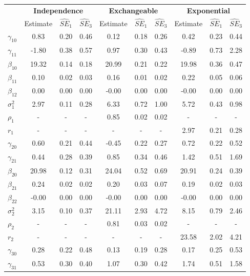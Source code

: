 \begin{table}[ht]
\begin{center}
\begin{tabular}{lccccccccc}
  \thickhline&\multicolumn{3}{c}{\textbf{Independence}}&\multicolumn{3}{c}{\textbf{Exchangeable}}&\multicolumn{3}{c}{\textbf{Exponential}}\\&Estimate&$\widehat{SE}_1$&$\widehat{SE}_3$&Estimate&$\widehat{SE}_1$&$\widehat{SE}_3$&Estimate&$\widehat{SE}_1$&$\widehat{SE}_3$\\\hline $\gamma_{10}$ & 0.83 & 0.20 & 0.46 & 0.12 & 0.18 & 0.26 & 0.42 & 0.23 & 0.44 \\ 
  $\gamma_{11}$ & -1.80 & 0.38 & 0.57 & 0.97 & 0.30 & 0.43 & -0.89 & 0.73 & 2.28 \\ 
  $\beta_{10}$ & 19.32 & 0.14 & 0.18 & 20.99 & 0.21 & 0.22 & 19.98 & 0.36 & 0.47 \\ 
  $\beta_{11}$ & 0.10 & 0.02 & 0.03 & 0.16 & 0.01 & 0.02 & 0.22 & 0.05 & 0.06 \\ 
  $\beta_{12}$ & 0.00 & 0.00 & 0.00 & -0.00 & 0.00 & 0.00 & -0.00 & 0.00 & 0.00 \\ 
  $\sigma_1^2$ & 2.97 & 0.11 & 0.28 & 6.33 & 0.72 & 1.00 & 5.72 & 0.43 & 0.98 \\ 
  $\rho_1$ & - & - & - & 0.85 & 0.02 & 0.02 & - & - & - \\ 
  $r_1$ & - & - & - & - & - & - & 2.97 & 0.21 & 0.28 \\ 
  $\gamma_{20}$ & 0.60 & 0.21 & 0.44 & -0.45 & 0.22 & 0.27 & 0.72 & 0.22 & 0.52 \\ 
  $\gamma_{21}$ & 0.44 & 0.28 & 0.39 & 0.85 & 0.34 & 0.46 & 1.42 & 0.51 & 1.69 \\ 
  $\beta_{20}$ & 20.98 & 0.12 & 0.31 & 24.04 & 0.52 & 0.69 & 20.91 & 0.24 & 0.39 \\ 
  $\beta_{21}$ & 0.24 & 0.02 & 0.02 & 0.20 & 0.03 & 0.07 & 0.19 & 0.02 & 0.03 \\ 
  $\beta_{22}$ & -0.00 & 0.00 & 0.00 & -0.00 & 0.00 & 0.00 & -0.00 & 0.00 & 0.00 \\ 
  $\sigma_2^2$ & 3.15 & 0.10 & 0.37 & 21.11 & 2.93 & 4.72 & 8.15 & 0.79 & 2.46 \\ 
  $\rho_2$ & - & - & - & 0.81 & 0.03 & 0.02 & - & - & - \\ 
  $r_2$ & - & - & - & - & - & - & 23.58 & 2.02 & 4.21 \\ 
  $\gamma_{30}$ & 0.28 & 0.22 & 0.48 & 0.13 & 0.19 & 0.28 & 0.17 & 0.25 & 0.53 \\ 
  $\gamma_{31}$ & 0.53 & 0.30 & 0.40 & 1.07 & 0.30 & 0.42 & 1.74 & 0.51 & 1.58 \\ 

\end{tabular}
\end{center}
\end{table}
